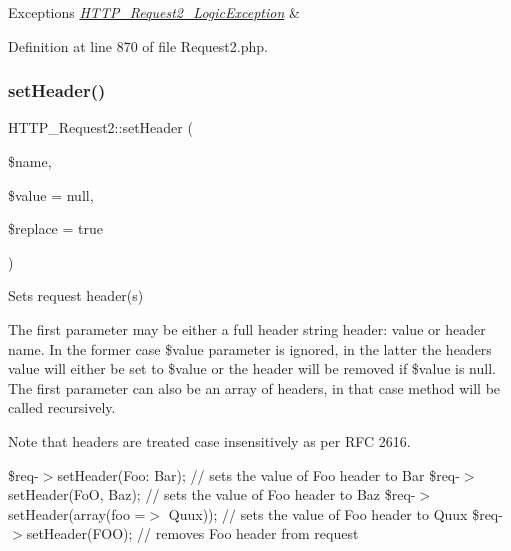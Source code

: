 \begin{DoxyExceptions}{Exceptions}
{\em \hyperlink{classHTTP__Request2__LogicException}{H\+T\+T\+P\+\_\+\+Request2\+\_\+\+Logic\+Exception}} & \\
\hline
\end{DoxyExceptions}


Definition at line 870 of file Request2.\+php.

\mbox{\label{classHTTP__Request2_adbdceb126835d75826cc461c27d27b14}} 
\subsubsection{\texorpdfstring{set\+Header()}{setHeader()}}
{\footnotesize\ttfamily H\+T\+T\+P\+\_\+\+Request2\+::set\+Header (\begin{DoxyParamCaption}\item[{}]{\$name,  }\item[{}]{\$value = {\ttfamily null},  }\item[{}]{\$replace = {\ttfamily true} }\end{DoxyParamCaption})}

Sets request header(s)

The first parameter may be either a full header string \textquotesingle{}header\+: value\textquotesingle{} or header name. In the former case \$value parameter is ignored, in the latter the header\textquotesingle{}s value will either be set to \$value or the header will be removed if \$value is null. The first parameter can also be an array of headers, in that case method will be called recursively.

Note that headers are treated case insensitively as per R\+FC 2616.

{\ttfamily  \$req-\/$>$set\+Header(\textquotesingle{}Foo\+: Bar\textquotesingle{}); // sets the value of \textquotesingle{}Foo\textquotesingle{} header to \textquotesingle{}Bar\textquotesingle{} \$req-\/$>$set\+Header(\textquotesingle{}FoO\textquotesingle{}, \textquotesingle{}Baz\textquotesingle{}); // sets the value of \textquotesingle{}Foo\textquotesingle{} header to \textquotesingle{}Baz\textquotesingle{} \$req-\/$>$set\+Header(array(\textquotesingle{}foo\textquotesingle{} =$>$ \textquotesingle{}Quux\textquotesingle{})); // sets the value of \textquotesingle{}Foo\textquotesingle{} header to \textquotesingle{}Quux\textquotesingle{} \$req-\/$>$set\+Header(\textquotesingle{}F\+OO\textquotesingle{}); // removes \textquotesingle{}Foo\textquotesingle{} header from request }


